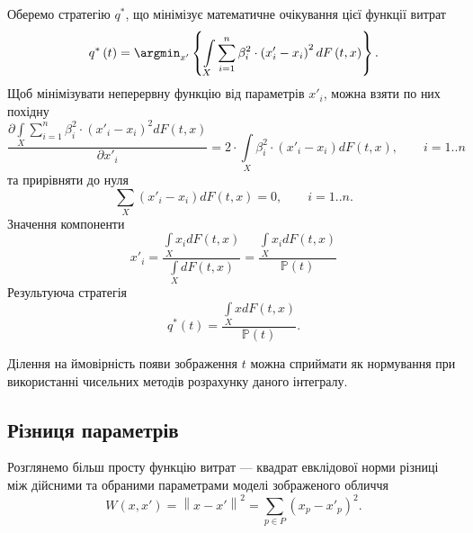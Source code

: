 Оберемо стратегію $q^*$,
що мінімізує математичне очікування цієї функції витрат
\begin{equation*}
  q^* \left( t \right)
  = \argmin_{x'} \left\{
    \int\limits_{X}
        \sum_{i = 1}^n \beta_i^2 \cdot \left( x'_i - x_i \right)^2
        dF\left( t, x \right)
    \right\}.
\end{equation*}
Щоб мінімізувати неперервну функцію від параметрів $x'_i$,
можна взяти по них похідну
\begin{equation*}
  \frac{\partial \int\limits_{X}
      \sum\limits_{i = 1}^n \beta_i^2 \cdot \left( x'_i - x_i \right)^2
      dF\left( t, x \right)
  }{\partial x'_i}
  = 2 \cdot \int\limits_{X}
    \beta_i^2 \cdot \left( x'_i - x_i \right) dF\left( t, x \right),
    \qquad i = 1..n
\end{equation*}
та прирівняти до нуля
\begin{equation*}
  \sum_{X} \left( x'_i - x_i \right) dF\left( t, x \right) = 0,
  \qquad i = 1..n.
\end{equation*}
Значення компоненти
\begin{equation*}
  x'_i
  = \frac{\int\limits_{X} x_i dF\left( t, x \right)}
         {\int\limits_{X} dF\left( t, x \right)}
  = \frac{\int\limits_{X} x_i dF\left( t, x \right)}
         {\mathbb{P}\left( t \right)}
\end{equation*}
Результуюча стратегія
\begin{equation*}
  q^*\left( t \right)
  = \frac{\int\limits_{X} x dF\left( t, x \right)}{\mathbb{P}\left( t \right)}.
\end{equation*}

Ділення на ймовірність появи зображення $t$ можна сприймати як нормування
при використанні чисельних методів розрахунку даного інтегралу.

\subsection{Різниця параметрів}

Розглянемо більш просту функцію витрат ---
квадрат евклідової норми різниці між дійсними та обраними параметрами
моделі зображеного обличчя
\begin{equation*}
  W \left( x, x' \right)
  = \left\| x - x' \right\|^2
  = \sum_{p \in P} \left( x_p - x'_p \right)^2.
\end{equation*}

